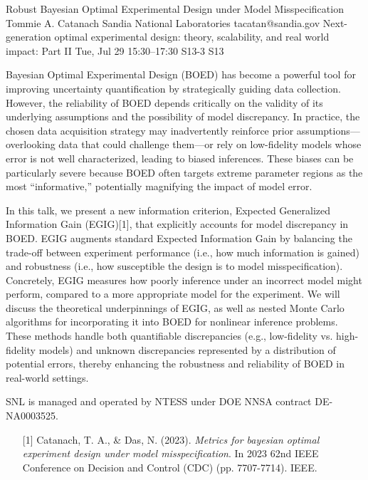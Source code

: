 \begin{talk}
  {Robust Bayesian Optimal Experimental Design under Model Misspecification}%
  {Tommie A. Catanach}%
  {Sandia National Laboratories}%
  {tacatan@sandia.gov}%
  {Next-generation optimal experimental design: theory, scalability, and real world impact: Part II}%
  {}%
  {Tue, Jul 29 15:30–17:30}%
  {S13-3}%
  {S13}%
				
			
Bayesian Optimal Experimental Design (BOED) has become a powerful tool for improving uncertainty quantification by strategically guiding data collection. However, the reliability of BOED depends critically on the validity of its underlying assumptions and the possibility of model discrepancy. In practice, the chosen data acquisition strategy may inadvertently reinforce prior assumptions—overlooking data that could challenge them—or rely on low-fidelity models whose error is not well characterized, leading to biased inferences. These biases can be particularly severe because BOED often targets extreme parameter regions as the most “informative,” potentially magnifying the impact of model error.

In this talk, we present a new information criterion, Expected Generalized Information Gain (EGIG)[1], that explicitly accounts for model discrepancy in BOED. EGIG augments standard Expected Information Gain by balancing the trade-off between experiment performance (i.e., how much information is gained) and robustness (i.e., how susceptible the design is to model misspecification). Concretely, EGIG measures how poorly inference under an incorrect model might perform, compared to a more appropriate model for the experiment. We will discuss the theoretical underpinnings of EGIG, as well as nested Monte Carlo algorithms for incorporating it into BOED for nonlinear inference problems. These methods handle both quantifiable discrepancies (e.g., low-fidelity vs. high-fidelity models) and unknown discrepancies represented by a distribution of potential errors, thereby enhancing the robustness and reliability of BOED in real-world settings.

SNL is managed and operated by NTESS under DOE NNSA contract DE-NA0003525. 
\medskip

\begin{enumerate}
	\item[{[1]}] Catanach, T. A., \& Das, N. (2023). {\it Metrics for bayesian optimal experiment design under model misspecification}. In 2023 62nd IEEE Conference on Decision and Control (CDC) (pp. 7707-7714). IEEE.
\end{enumerate}
\end{talk}

